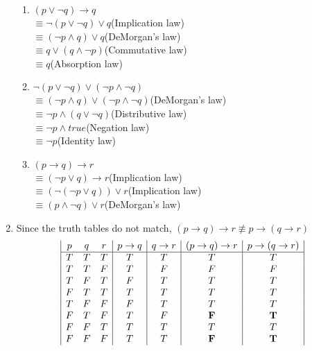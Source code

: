 \documentclass[12pt, a4paper]{article}
\begin{document}
\begin{enumerate}[Q\arabic*.]
\begin{enumerate}[(\alph*)]
    \item $(p \lor \neg q) \rightarrow q$ \\
      $\equiv \neg (p \lor \neg q) \lor q$\hfill(Implication law)\\
      $\equiv (\neg p \land q) \lor q$\hfill(DeMorgan's law)\\
      $\equiv q \lor (q \land \neg p)$\hfill(Commutative law)\\
      $\equiv q$\hfill(Absorption law)

    \item $\neg(p\lor \neg q)\lor(\neg p \land \neg q)$\\
      $\equiv (\neg p \land q)\lor(\neg p \land \neg q)$\hfill(DeMorgan's law)\\
      $\equiv \neg p \land (q \lor \neg q)$\hfill(Distributive law)\\
      $\equiv \neg p \land true$\hfill(Negation law)\\
      $\equiv \neg p$\hfill(Identity law)

    \item $(p \rightarrow q)\rightarrow r$\\
      $\equiv (\neg p \lor q) \rightarrow r$\hfill(Implication law)\\
      $\equiv (\neg(\neg p \lor q)) \lor r$\hfill(Implication law)\\
      $\equiv (p \land \neg q) \lor r$\hfill(DeMorgan's law)\\
    \end{enumerate}

  \item Since the truth tables do not match, $(p \rightarrow q) \rightarrow r \not\equiv p \rightarrow (q \rightarrow r)$
  \begin{displaymath}
    \begin{array}{|c c c|c|c|c|c|}
      p & q & r & p \rightarrow q & q \rightarrow r & (p \rightarrow q) \rightarrow r & p \rightarrow (q \rightarrow r)\\ %
      \hline %
      T & T & T & T & T & T & T\\
      T & T & F & T & F & F & F\\
      T & F & T & F & T & T & T\\
      F & T & T & T & T & T & T\\
      T & F & F & F & T & T & T\\
      F & T & F & T & F & \mathbf{F} & \mathbf{T}\\
      F & F & T & T & T & T & T\\
      F & F & F & T & T & \mathbf{F} & \mathbf{T}\\
    \end{array}
  \end{displaymath}


\end{enumerate}
\end{document}
